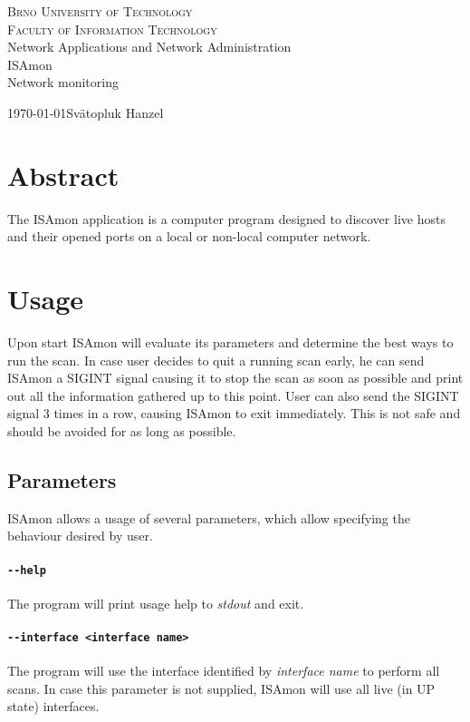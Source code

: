 \documentclass[11pt,a4paper]{article}
\begin{document}
\begin{titlepage}
	\begin{center}
	    {\LARGE\textsc{Brno University of Technology}}\\
	    \smallskip
	    {\Large\textsc{Faculty of Information Technology}}\\
	    \bigskip
	    \LARGE{Network Applications and Network Administration}\\
	    \smallskip
		\Huge{ISAmon}\\
		\huge{Network monitoring}
	\end{center}
    {\today \hfill Svätopluk Hanzel}
\end{titlepage}

\tableofcontents

\newpage
\section*{Abstract}
	The ISAmon application is a computer program designed to discover live hosts and their opened ports on a local or non-local computer network.
\newpage

\section{Usage}
	Upon start ISAmon will evaluate its parameters and determine the best ways to run the scan. In case user decides to quit a running scan early, he can send ISAmon a SIGINT signal causing it to stop the scan as soon as possible and print out all the information gathered up to this point. User can also send the SIGINT signal 3 times in a row, causing ISAmon to exit immediately. This is not safe and should be avoided for as long as possible.
		
	\subsection{Parameters}
		ISAmon allows a usage of several parameters, which allow specifying the behaviour desired by user.
		\paragraph{\texttt{-{}-help}} The program will print usage help to \emph{stdout} and exit.
		\vspace{-0.5cm}
		\paragraph{\texttt{-{}-interface <interface name>}} The program will use the interface identified by \emph{interface name} to perform all scans. In case this parameter is not supplied, ISAmon will use all live (in UP state) interfaces.
		\vspace{-0.5cm}
\end{document}
